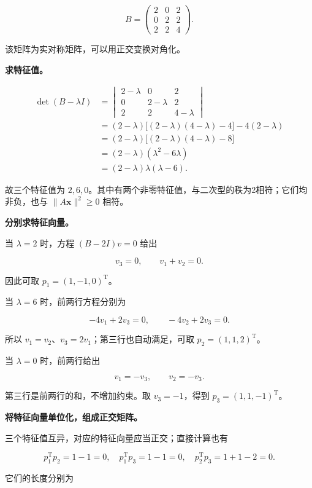 \documentclass[UTF8,11pt,fontset=windows]{ctexart}
\begin{document}
$$
B=\begin{pmatrix}2&0&2\\0&2&2\\2&2&4\end{pmatrix}.
$$

该矩阵为实对称矩阵，可以用正交变换对角化。

\textbf{求特征值。}

$$
\begin{aligned}
\det(B-\lambda I)
&=\begin{vmatrix}2-\lambda&0&2\\0&2-\lambda&2\\2&2&4-\lambda\end{vmatrix}\\
&=(2-\lambda)\big[(2-\lambda)(4-\lambda)-4\big]
-4(2-\lambda)\\
&=(2-\lambda)\big[(2-\lambda)(4-\lambda)-8\big]\\
&=(2-\lambda)(\lambda^2-6\lambda)\\
&=(2-\lambda)\lambda(\lambda-6).
\end{aligned}
$$

故三个特征值为 $2,6,0$。其中有两个非零特征值，与二次型的秩为2相符；它们均非负，也与 $\|A\boldsymbol x\|^2\ge0$ 相符。

\textbf{分别求特征向量。}

当 $\lambda=2$ 时，方程 $(B-2I)v=0$ 给出

$$
v_3=0,
\qquad v_1+v_2=0.
$$

因此可取 $p_1=(1,-1,0)^{\mathrm T}$。

当 $\lambda=6$ 时，前两行方程分别为

$$
-4v_1+2v_3=0,
\qquad-4v_2+2v_3=0.
$$

所以 $v_1=v_2$、$v_3=2v_1$；第三行也自动满足，可取 $p_2=(1,1,2)^{\mathrm T}$。

当 $\lambda=0$ 时，前两行给出

$$
v_1=-v_3,
\qquad v_2=-v_3.
$$

第三行是前两行的和，不增加约束。取 $v_3=-1$，得到 $p_3=(1,1,-1)^{\mathrm T}$。

\textbf{将特征向量单位化，组成正交矩阵。}

三个特征值互异，对应的特征向量应当正交；直接计算也有

$$
p_1^{\mathrm T}p_2=1-1=0,
\quad p_1^{\mathrm T}p_3=1-1=0,
\quad p_2^{\mathrm T}p_3=1+1-2=0.
$$

它们的长度分别为
\end{document}
